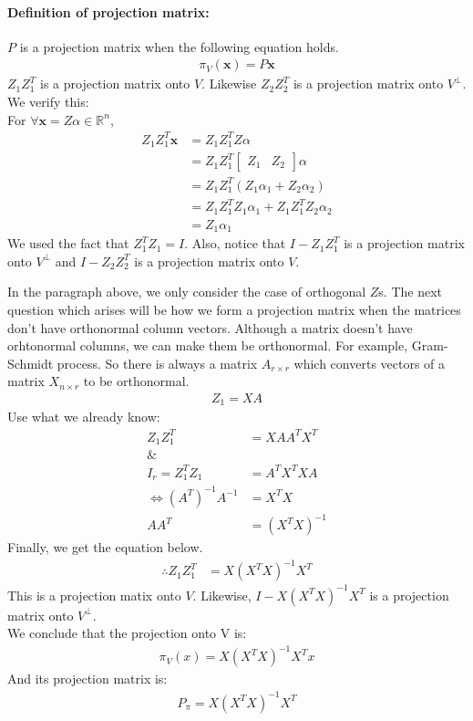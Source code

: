 \documentclass{article}
\begin{document}
\paragraph{Definition of projection matrix:} \(P\) is a projection matrix when the following equation holds. 
\begin{align*}
\pi_V(\mathbf{x})=P\mathbf{x}
\end{align*}
\(Z_1Z_1^T\) is a projection matrix onto \(V\). Likewise \(Z_2Z_2^T\) is a projection matrix onto \(V^\perp\). We verify this:\\
For \(\forall \mathbf{x} = Z\alpha \in \mathbb{R}^n\),
\begin{align*}
Z_1Z_1^T\mathbf{x}&=Z_1Z_1^TZ\alpha\\
&=Z_1Z_1^T\left[\begin{matrix}Z_1 & Z_2\end{matrix}\right]\alpha\\
&=Z_1Z_1^T\left(Z_1\alpha_1+ Z_2\alpha_2\right)\\
&=Z_1Z_1^TZ_1\alpha_1 + Z_1Z_1^TZ_2\alpha_2\\
&=Z_1\alpha_1
\end{align*}
We used the fact that \(Z_1^TZ_1=I\). Also, notice that \(I-Z_1Z_1^T\) is a projection matrix onto \(V^\perp\) and \(I-Z_2Z_2^T\) is a projection matrix onto \(V\).

In the paragraph above, we only consider the case of orthogonal \(Z\)s. The next question which arises will be how we form a projection matrix when the matrices don't have orthonormal column vectors. Although a matrix doesn't have orhtonormal columns, we can make them be orthonormal. For example, Gram-Schmidt process. So there is always a matrix \(A_{r\times r}\) which converts vectors of a matrix \(X_{n \times r}\) to be orthonormal.
\begin{align*}
Z_1 = XA
\end{align*}
Use what we already know:
\begin{align*}
Z_1 Z_1^T&=XA A^T X^T\\
\&\\
I_r = Z_1^TZ_1 &= A^TX^TXA\\
\iff (A^T)^{-1}A^{-1}&=X^TX\\
AA^T&=(X^TX)^{-1}
\end{align*}
Finally, we get the equation below.
\begin{align*}
\therefore Z_1Z_1^T&=X(X^TX)^{-1}X^T
\end{align*}
This is a projection matix onto \(V\). Likewise, \(I-X(X^TX)^{-1}X^T\) is a projection matrix onto \(V^\perp\).\\
We conclude that the projection onto V is:
\begin{align*}
\pi_V(x)=X(X^TX)^{-1}X^Tx
\end{align*}
And its projection matrix is:
\begin{align*}
P_\pi=X(X^TX)^{-1}X^T
\end{align*}
\end{document}
